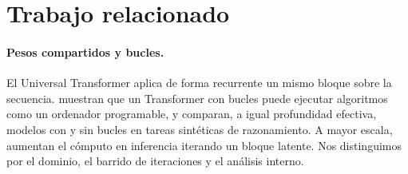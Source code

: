 \section{Trabajo relacionado}

\paragraph{Pesos compartidos y bucles.}
El Universal Transformer \citep{dehghani2019universal} aplica de forma
recurrente un mismo bloque sobre la secuencia. \citet{giannou2023looped}
muestran que un Transformer con bucles puede ejecutar algoritmos como un
ordenador programable, y \citet{saunshi2025reasoning} comparan, a igual
profundidad efectiva, modelos con y sin bucles en tareas sintéticas de
razonamiento. A mayor escala, \citet{geiping2025scaling} aumentan el cómputo en
inferencia iterando un bloque latente. Nos distinguimos por el dominio, el barrido de iteraciones y el análisis interno.


